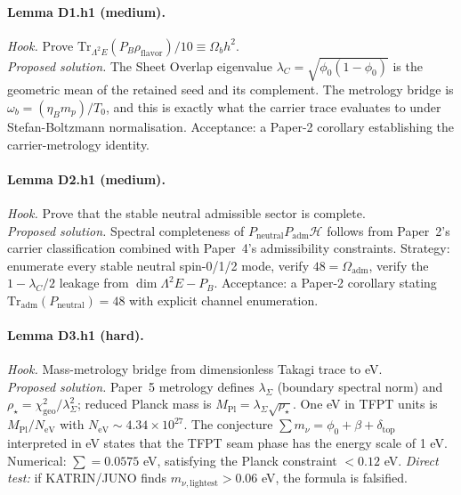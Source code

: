 \documentclass[11pt,a4paper]{article}
\begin{document}
\paragraph{Lemma D1.h1 (medium).}
\emph{Hook.}  Prove
\(\mathrm{Tr}_{\Lambda^2 E}(P_B\rho_{\mathrm{flavor}})/10
\equiv \Omega_b h^2\).\\
\emph{Proposed solution.}  The Sheet Overlap eigenvalue
\(\lambda_C=\sqrt{\phi_0(1-\phi_0)}\) is the geometric mean of the
retained seed and its complement.  The metrology bridge is
\(\omega_b=(\eta_B m_p)/T_0\), and this is exactly what the
carrier trace evaluates to under Stefan-Boltzmann normalisation.
Acceptance: a Paper-2 corollary establishing the carrier-metrology
identity.

\paragraph{Lemma D2.h1 (medium).}
\emph{Hook.}  Prove that the stable neutral admissible sector is
complete.\\
\emph{Proposed solution.}  Spectral completeness of \(P_{\mathrm{neutral}}P_{\mathrm{adm}}\mathcal H\) follows from Paper~2's carrier
classification combined with Paper~4's admissibility constraints.
Strategy: enumerate every stable neutral spin-0/1/2 mode, verify
\(48=\Omega_{\mathrm{adm}}\), verify the
\(1-\lambda_C/2\) leakage from \(\dim\Lambda^2 E - P_B\).
Acceptance: a Paper-2 corollary stating
\(\mathrm{Tr}_{\mathrm{adm}}(P_{\mathrm{neutral}})=48\) with explicit
channel enumeration.

\paragraph{Lemma D3.h1 (hard).}
\emph{Hook.}  Mass-metrology bridge from dimensionless Takagi trace
to eV.\\
\emph{Proposed solution.}  Paper~5 metrology defines
\(\lambda_\Sigma\) (boundary spectral norm) and
\(\rho_\star=\chi_{\mathrm{geo}}^2/\lambda_\Sigma^2\); reduced Planck
mass is \(M_{\mathrm{Pl}}=\lambda_\Sigma\sqrt{\rho_\star}\).  One eV
in TFPT units is \(M_{\mathrm{Pl}}/N_{\mathrm{eV}}\) with
\(N_{\mathrm{eV}}\sim 4.34\times 10^{27}\).  The conjecture
\(\sum m_\nu=\phi_0+\beta+\delta_{\mathrm{top}}\) interpreted in eV
states that the TFPT seam phase has the energy scale of 1 eV.
Numerical: \(\sum=0.0575\) eV, satisfying the Planck constraint
\(<0.12\) eV.  \emph{Direct test:} if KATRIN/JUNO finds
\(m_{\nu,\mathrm{lightest}}>0.06\) eV, the formula is falsified.
\end{document}
